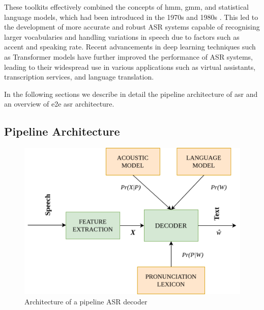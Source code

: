These toolkits effectively combined the concepts of \gls{hmm}, \gls{gmm}, and statistical language models, which had been introduced in the 1970s and 1980s \cite{meyer2019multi}. This led to the development of more accurate and robust ASR systems capable of recognising larger vocabularies and handling variations in speech due to factors such as accent and speaking rate. Recent advancements in deep learning techniques such as Transformer models have further improved the performance of ASR systems, leading to their widespread use in various applications such as virtual assistants, transcription services, and language translation.

In the following sections we describe in detail the pipeline architecture of \gls{asr} and an overview of \gls{e2e} \gls{asr} architecture.

\subsection{Pipeline Architecture}

\begin{figure}[ht]
	\begin{center}
		\includegraphics[width=0.7\linewidth]{asr-decoder.png}
		\caption{Architecture of a pipeline ASR  decoder}
		\label{fig:asr-decoder}
	\end{center}
\end{figure}

